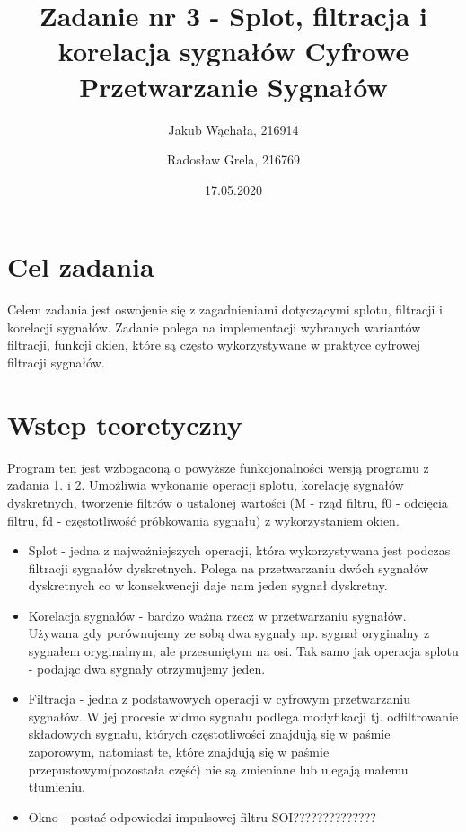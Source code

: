 \documentclass[12pt]{article}
\title{{\bf Zadanie nr 3 - Splot, filtracja i korelacja sygnałów}\linebreak
Cyfrowe Przetwarzanie Sygnałów}
\author{Jakub Wąchała, 216914 \and Radosław Grela, 216769}
\date{17.05.2020}
\begin{document}
\clearpage\maketitle
\thispagestyle{empty}
\newpage
\setcounter{page}{1}
\section{Cel zadania}
\label{cel}
Celem zadania jest oswojenie się z zagadnieniami dotyczącymi splotu, filtracji i korelacji sygnałów. Zadanie polega na implementacji wybranych wariantów filtracji, funkcji okien, które są często wykorzystywane w praktyce cyfrowej filtracji sygnałów. 

\section{Wstep teoretyczny}
Program ten jest wzbogaconą o powyższe funkcjonalności wersją programu z zadania 1. i 2. Umożliwia wykonanie operacji splotu, korelację sygnałów dyskretnych, tworzenie filtrów o ustalonej wartości (M - rząd filtru, f0 - odcięcia filtru, fd - częstotliwość próbkowania sygnału) z wykorzystaniem okien. 
\begin{itemize}
\item Splot - jedna z najważniejszych operacji, która wykorzystywana jest podczas filtracji sygnałów dyskretnych. Polega na przetwarzaniu dwóch sygnałów dyskretnych co w konsekwencji daje nam jeden sygnał dyskretny.
\item Korelacja sygnałów - bardzo ważna rzecz w przetwarzaniu sygnałów. Używana gdy porównujemy ze sobą dwa sygnały np. sygnał oryginalny z sygnałem oryginalnym, ale przesuniętym na osi. Tak samo jak operacja splotu - podając dwa sygnały otrzymujemy jeden.
\item Filtracja - jedna z podstawowych operacji w cyfrowym przetwarzaniu sygnałów. W jej procesie widmo sygnału podlega modyfikacji tj. odfiltrowanie składowych sygnału, których częstotliwości znajdują się w paśmie zaporowym, natomiast te, które znajdują się w paśmie przepustowym(pozostała część) nie są zmieniane lub ulegają małemu tłumieniu.
\item Okno - postać odpowiedzi impulsowej filtru SOI??????????????
\end{itemize}
\end{document}
